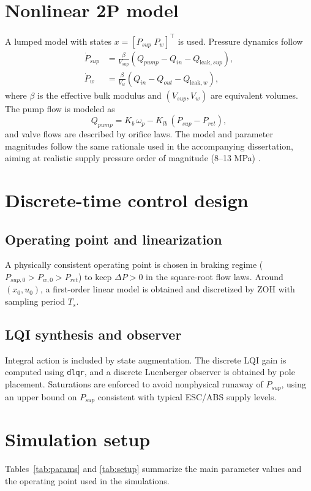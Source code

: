 \documentclass[a4paper]{ifacconf}
\begin{document}
\section{Nonlinear 2P model}
A lumped model with states $x=[P_{sup}\;P_w]^\top$ is used. Pressure dynamics follow
\begin{align}
    \dot{P}_{sup} & = \frac{\beta}{V_{sup}}\left(Q_{pump} - Q_{in} - Q_{\text{leak},sup}\right), \\
    \dot{P}_{w}   & = \frac{\beta}{V_{w}}\left(Q_{in} - Q_{out} - Q_{\text{leak},w}\right),
\end{align}
where $\beta$ is the effective bulk modulus and $(V_{sup},V_w)$ are equivalent volumes. The pump flow is modeled as
\begin{equation}
    Q_{pump} = K_b\,\omega_p - K_{lb}\,(P_{sup}-P_{ret}),
\end{equation}
and valve flows are described by orifice laws. The model and parameter magnitudes follow the same rationale used in the accompanying dissertation, aiming at realistic supply pressure order of magnitude (8--13 MPa) \citep{ZengYangHuang2023,HouhuaJing2022}.

\section{Discrete-time control design}
\subsection{Operating point and linearization}
A physically consistent operating point is chosen in braking regime ($P_{sup,0}>P_{w,0}>P_{ret}$) to keep $\Delta P>0$ in the square-root flow laws. Around $(x_0,u_0)$, a first-order linear model is obtained and discretized by ZOH with sampling period $T_s$.

\subsection{LQI synthesis and observer}
Integral action is included by state augmentation. The discrete LQI gain is computed using \texttt{dlqr}, and a discrete Luenberger observer is obtained by pole placement. Saturations are enforced to avoid nonphysical runaway of $P_{sup}$, using an upper bound on $P_{sup}$ consistent with typical ESC/ABS supply levels.

\section{Simulation setup}
Tables~\ref{tab:params} and \ref{tab:setup} summarize the main parameter values and the operating point used in the simulations.
\end{document}
